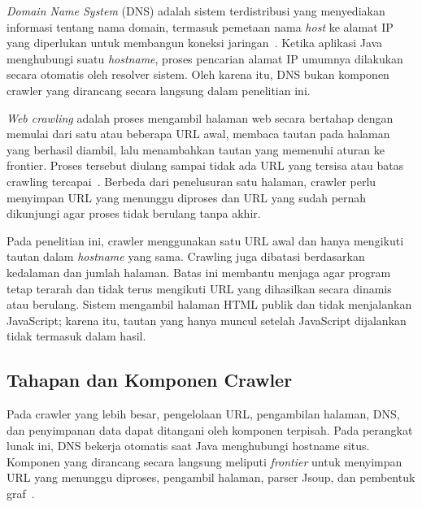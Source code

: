 \textit{Domain Name System} (DNS) adalah sistem terdistribusi yang menyediakan informasi tentang nama domain, termasuk pemetaan nama \textit{host} ke alamat IP yang diperlukan untuk membangun koneksi jaringan~\cite{rfc:87:dns}. Ketika aplikasi Java menghubungi suatu \textit{hostname}, proses pencarian alamat IP umumnya dilakukan secara otomatis oleh resolver sistem. Oleh karena itu, DNS bukan komponen crawler yang dirancang secara langsung dalam penelitian ini.

\textit{Web crawling} adalah proses mengambil halaman web secara bertahap dengan memulai dari satu atau beberapa URL awal, membaca tautan pada halaman yang berhasil diambil, lalu menambahkan tautan yang memenuhi aturan ke frontier. Proses tersebut diulang sampai tidak ada URL yang tersisa atau batas crawling tercapai~\cite{manning:08:introir}. Berbeda dari penelusuran satu halaman, crawler perlu menyimpan URL yang menunggu diproses dan URL yang sudah pernah dikunjungi agar proses tidak berulang tanpa akhir.

Pada penelitian ini, crawler menggunakan satu URL awal dan hanya mengikuti tautan dalam \textit{hostname} yang sama. Crawling juga dibatasi berdasarkan kedalaman dan jumlah halaman. Batas ini membantu menjaga agar program tetap terarah dan tidak terus mengikuti URL yang dihasilkan secara dinamis atau berulang. Sistem mengambil halaman HTML publik dan tidak menjalankan JavaScript; karena itu, tautan yang hanya muncul setelah JavaScript dijalankan tidak termasuk dalam hasil.

\subsection{Tahapan dan Komponen Crawler}

Pada crawler yang lebih besar, pengelolaan URL, pengambilan halaman, DNS, dan penyimpanan data dapat ditangani oleh komponen terpisah. Pada perangkat lunak ini, DNS bekerja otomatis saat Java menghubungi hostname situs. Komponen yang dirancang secara langsung meliputi \textit{frontier} untuk menyimpan URL yang menunggu diproses, pengambil halaman, parser Jsoup, dan pembentuk graf~\cite{manning:08:introir}.

